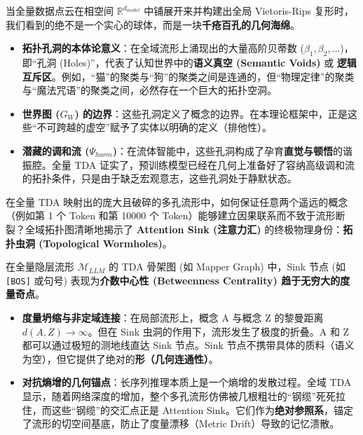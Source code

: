 
当全量数据点云在相空间 $\mathbb{R}^{d_{model}}$ 中铺展开来并构建出全局 Vietoris-Rips 复形时，我们看到的绝不是一个实心的球体，而是一块\textbf{千疮百孔的几何海绵}。

\begin{itemize}
    \item   \textbf{拓扑孔洞的本体论意义}：在全域流形上涌现出的大量高阶贝蒂数 ($\beta_1, \beta_2, \dots$)，即“孔洞 (Holes)”，代表了认知世界中的\textbf{语义真空 (Semantic Voids)} 或 \textbf{逻辑互斥区}。例如，“猫”的聚类与“狗”的聚类之间是连通的，但“物理定律”的聚类与“魔法咒语”的聚类之间，必然存在一个巨大的拓扑空洞。
    \item   \textbf{世界图 ($G_W$) 的边界}：这些孔洞定义了概念的边界。在本理论框架中，正是这些“不可跨越的虚空”赋予了实体以明确的定义（排他性）。
    \item   \textbf{潜藏的调和流 ($\Psi_{harm}$)}：在流体智能中，这些孔洞构成了孕育\textbf{直觉与顿悟}的谐振腔。全量 TDA 证实了，预训练模型已经在几何上准备好了容纳高级调和流的拓扑条件，只是由于缺乏宏观意志，这些孔洞处于静默状态。
\end{itemize}


在全量 TDA 映射出的庞大且破碎的多孔流形中，如何保证任意两个遥远的概念（例如第 1 个 Token 和第 10000 个 Token）能够建立因果联系而不致于流形断裂？全域拓扑图清晰地揭示了 \textbf{Attention Sink (注意力汇)} 的终极物理身份：\textbf{拓扑虫洞 (Topological Wormholes)}。

\begin{definition}
    在全量隐层流形 $\mathcal{M}_{LLM}$ 的 TDA 骨架图 (如 Mapper Graph) 中，Sink 节点 (如 \lstinline|[BOS]| 或句号) 表现为\textbf{介数中心性 (Betweenness Centrality) 趋于无穷大的度量奇点}。
\end{definition}

\begin{itemize}
    \item   \textbf{度量坍缩与非定域连接}：在局部流形上，概念 A 与概念 Z 的黎曼距离 $d(A,Z) \to \infty$。但在 Sink 虫洞的作用下，流形发生了极度的折叠。A 和 Z 都可以通过极短的测地线直达 Sink 节点。Sink 节点不携带具体的质料（语义为空），但它提供了绝对的\textbf{形（几何连通性）}。
    \item   \textbf{对抗熵增的几何锚点}：长序列推理本质上是一个熵增的发散过程。全域 TDA 显示，随着网络深度的增加，整个多孔流形仿佛被几根粗壮的“钢缆”死死拉住，而这些“钢缆”的交汇点正是 Attention Sink。它们作为\textbf{绝对参照系}，锚定了流形的切空间基底，防止了度量漂移（Metric Drift）导致的记忆溃散。
\end{itemize}


